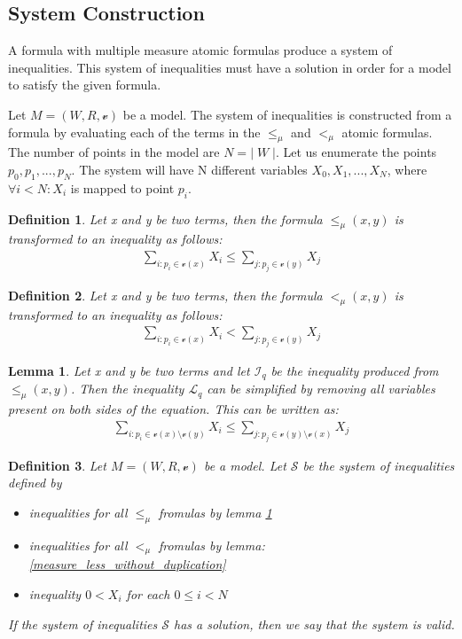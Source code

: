 \documentclass{article}
\newtheorem{defn}{Definition}[section]
\newtheorem{lemma}[theorem]{Lemma}
\newcommand{\vE}{\mathscr{v}}
\begin{document}
		\leavevmode\newline
		\subsection{System Construction}
		A formula with multiple measure atomic formulas produce a system of inequalities.
		This system of inequalities must have a solution in order for a model to satisfy the given formula.

		Let $M = (W, R, \vE)$ be a model. The system of inequalities is constructed from a formula by evaluating each
		of the terms in the $\le_\mu$ and $<_\mu$ atomic formulas. The number of points in the model are $N = | \; W \; |$. Let us enumerate the points
		$p_0, p_1, ..., p_N$. The system will have N different variables $X_0, X_1, ..., X_N$, 
		where $\forall i < N: X_i$ is mapped to point $p_i$.

		\begin{defn}
			Let x and y be two terms, then the formula $\le_\mu(x, y)$ is transformed to an inequality as follows:
			\begin{align*}
				\sum_{i: p_i \in \vE(x)} X_i \leq \sum_{j: p_j \in \vE(y)} X_j
			\end{align*}
		\end{defn}

		\begin{defn}
			Let x and y be two terms, then the formula $<_\mu(x, y)$ is transformed to an inequality as follows:
			\begin{align*}
				\sum_{i: p_i \in \vE(x)} X_i < \sum_{j: p_j \in \vE(y)} X_j
			\end{align*}
		\end{defn}

		\begin{lemma} \label{measure_less_equal_without_duplication}
			Let x and y be two terms and let $\mathscr{I}_q$ be the inequality produced from $\le_\mu(x, y)$. Then the inequality $\mathscr{L}_q$ can be simplified 
			by removing all variables present on both sides of the equation. This can be written as:
			\begin{align*}
				\sum_{i: p_i \in \vE(x) \setminus \vE(y)} X_i \leq \sum_{j: p_j \in \vE(y) \setminus \vE(x)} X_j
			\end{align*}
		\end{lemma}

		\begin{defn}
			Let $M = (W, R, \vE)$ be a model. Let $\mathscr{S}$ be the system of inequalities defined by
			\begin{itemize}
				\item inequalities for all $\le_\mu$ fromulas by lemma \ref{measure_less_equal_without_duplication}
				\item inequalities for all $<_\mu$ fromulas by lemma: \ref{measure_less_without_duplication}
				\item inequality $0 < X_i$ for each $0 \le i < N$  
			\end{itemize}
			If the system of inequalities $\mathscr{S}$ has a solution, then we say that the system is valid.
		\end{defn}
\end{document}
